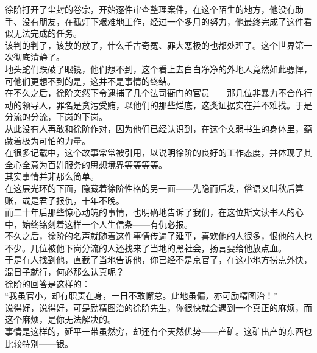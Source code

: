 \begin{multicols}{\theparacolNo}
徐阶打开了尘封的卷宗，开始逐件审查整理案件，在这个陌生的地方，他没有助手、没有朋友，在孤灯下艰难地工作，经过一个多月的努力，他最终完成了这件看似无法完成的任务。\\

该判的判了，该放的放了，什么千古奇冤、罪大恶极的也都处理了。这个世界第一次彻底清静了。\\

地头蛇们跌破了眼镜，他们想不到，这个看上去白白净净的外地人竟然如此骠悍，可他们更想不到的是，这并不是事情的终结。\\

在不久之后，徐阶突然下令逮捕了几个法司衙门的官员——那几位非暴力不合作行动的领导人，罪名是贪污受贿，以他们的那些烂底，这类证据实在并不难找。于是分流的分流，下岗的下岗。\\

从此没有人再敢和徐阶作对，因为他们已经认识到，在这个文弱书生的身体里，蕴藏着极为可怕的力量。\\

在很多记载中，这个故事常常被引用，以说明徐阶的良好的工作态度，并体现了其全心全意为百姓服务的思想境界等等等等。\\

其实事情并非那么简单。\\

在这层光环的下面，隐藏着徐阶性格的另一面——先隐而后发，俗语又叫秋后算账，或是君子报仇，十年不晚。\\

而二十年后那些惊心动魄的事情，也明确地告诉了我们，在这位斯文读书人的心中，始终铭刻着这样一个人生信条——有仇必报。\\

不久之后，徐阶的名声就随着这件事情传遍了延平，喜欢他的人很多，恨他的人也不少。几位被他下岗分流的人还找来了当地的黑社会，扬言要给他放点血。\\

于是有人找到他，直截了当地告诉他，你已经不是京官了，在这小地方捞点外快，混日子就行，何必那么认真呢？\\

徐阶的回答是这样的：\\

“我虽官小，却有职责在身，一日不敢懈怠。此地虽偏，亦可励精图治！”\\

说得好，说得好，可是励精图治的徐阶先生，你很快就会遇到一个真正的麻烦，而这个麻烦，是你无法解决的。\\

事情是这样的，延平一带虽然穷，却还有个天然优势——产矿。这矿出产的东西也比较特别——银。\\


\end{multicols}
